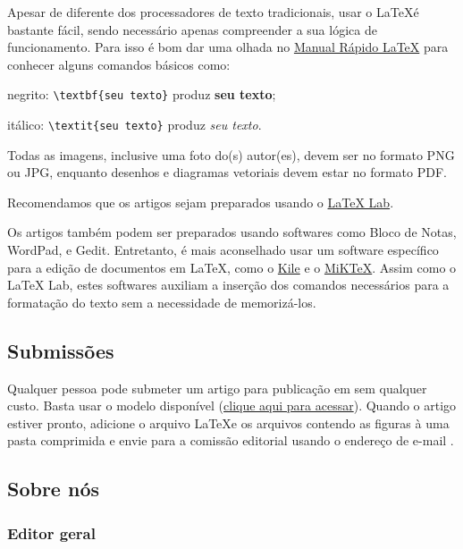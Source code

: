 Apesar de diferente dos processadores de texto tradicionais, usar o \LaTeX é bastante fácil, sendo necessário apenas compreender a sua lógica de funcionamento. Para isso é bom dar uma olhada no \href{http://www.stdout.org/~winston/latex/}{Manual Rápido LaTeX} para conhecer alguns comandos básicos como:

\begin{description}
 \item negrito: \verb|\textbf{seu texto}| produz \textbf{seu texto};
 \item itálico: \verb|\textit{seu texto}| produz \textit{seu texto}.
\end{description}

Todas as imagens, inclusive uma foto do(s) autor(es), devem ser no formato PNG ou JPG, enquanto desenhos e diagramas vetoriais devem estar no formato PDF.


Recomendamos que os artigos sejam preparados usando o \href{http://docs.latexlab.org/}{LaTeX Lab}.

Os artigos também podem ser preparados usando softwares como Bloco de Notas, WordPad, e Gedit. Entretanto, é mais aconselhado usar um software específico para a edição de documentos em \LaTeX, como o \href{http://kile.sourceforge.net/}{Kile} e o \href{http://miktex.org/}{MiKTeX}. Assim como o LaTeX Lab, estes softwares auxiliam a inserção dos comandos necessários para a formatação do texto sem a necessidade de memorizá-los.

\subsection{Submissões}

Qualquer pessoa pode submeter um artigo para publicação em \pedometria sem qualquer custo. Basta usar o modelo disponível (\href{https://sites.google.com/site/pedometria/file-cabinet}{clique aqui para acessar}). Quando o artigo estiver pronto, adicione o arquivo \LaTeX e os arquivos contendo as figuras à uma pasta comprimida e envie para a comissão editorial usando o endereço de e-mail .

\subsection{Sobre nós}

\subsubsection{Editor geral}

